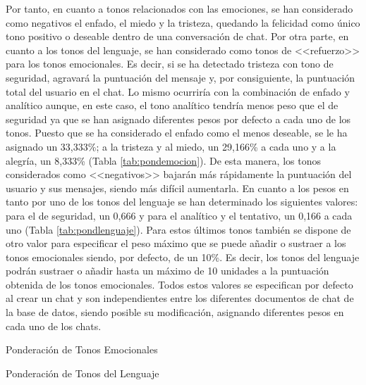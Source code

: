 Por tanto, en cuanto a tonos relacionados con las emociones, se han considerado como negativos el enfado, el miedo y la tristeza, quedando la felicidad como único tono positivo o deseable dentro de una conversación de chat. Por otra parte, en cuanto a los tonos del lenguaje, se han considerado como tonos de <<refuerzo>> para los tonos emocionales. Es decir, si se ha detectado tristeza con tono de seguridad, agravará la puntuación del mensaje y, por consiguiente, la puntuación total del usuario en el chat. Lo mismo ocurriría con la combinación de enfado y analítico aunque, en este caso, el tono analítico tendría menos peso que el de seguridad ya que se han asignado diferentes pesos por defecto a cada uno de los tonos. Puesto que se ha considerado el enfado como el menos deseable, se le ha asignado un 33,333\%; a la tristeza y al miedo, un 29,166\% a cada uno y a la alegría, un 8,333\% (Tabla \ref{tab:pondemocion}). De esta manera, los tonos considerados como <<negativos>> bajarán más rápidamente la puntuación del usuario y sus mensajes, siendo más difícil aumentarla. En cuanto a los pesos en tanto por uno de los tonos del lenguaje se han determinado los siguientes valores: para el de seguridad, un 0,666 y para el analítico y el tentativo, un 0,166 a cada uno (Tabla \ref{tab:pondlenguaje}). Para estos últimos tonos también se dispone de otro valor para especificar el peso máximo que se puede añadir o sustraer a los tonos emocionales siendo, por defecto, de un 10\%. Es decir, los tonos del lenguaje podrán sustraer o añadir hasta un máximo de 10 unidades a la puntuación obtenida de los tonos emocionales. Todos estos valores se especifican por defecto al crear un chat y son independientes entre los diferentes documentos de chat de la base de datos, siendo posible su modificación, asignando diferentes pesos en cada uno de los chats.

\begin{table}[!htbp]
	\centering
	{\small
		
	}
	\caption[Ponderación de Tonos Emocionales]
	{Ponderación de Tonos Emocionales}
	\label{tab:pondemocion}
\end{table}

\begin{table}[!htbp]
	\centering
	{\small
		
	}
	\caption[Ponderación de Tonos del Lenguaje]
	{Ponderación de Tonos del Lenguaje}
	\label{tab:pondlenguaje}
\end{table}

\clearpage


